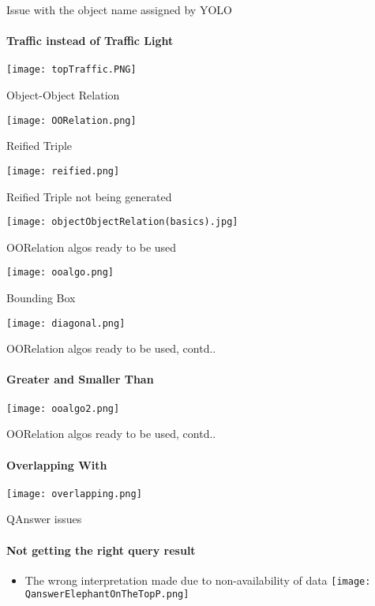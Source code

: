 \documentclass{beamer}
\begin{document}
\begin{frame}{Issue with the object name assigned by YOLO}
\framesubtitle{Traffic instead of Traffic Light}
\texttt{[image: topTraffic.PNG]}

 
\end{frame}


\begin{frame}{Object-Object Relation}

\texttt{[image: OORelation.png]}

 
\end{frame}


\begin{frame}{Reified Triple }

\texttt{[image: reified.png]}

 
\end{frame}

\begin{frame}{Reified Triple not being generated}

\texttt{[image: objectObjectRelation(basics).jpg]}

 
\end{frame}



\begin{frame}{OORelation algos ready to be used}



\texttt{[image: ooalgo.png]}

 
\end{frame}

\begin{frame}{Bounding Box}


\texttt{[image: diagonal.png]}

\end{frame}

\begin{frame}{OORelation algos ready to be used, contd..}
\framesubtitle{Greater and Smaller Than}


      \texttt{[image: ooalgo2.png]}


\end{frame}

\begin{frame}{OORelation algos ready to be used, contd..}
\framesubtitle{Overlapping With}
\texttt{[image: overlapping.png]}

 
\end{frame}

\begin{frame}{QAnswer issues}
\framesubtitle{Not getting the right query result}
\begin{itemize}
\item The wrong interpretation made due to non-availability of data
\texttt{[image: QanswerElephantOnTheTopP.png]}

\end{itemize} 
\end{frame}
\end{document}
